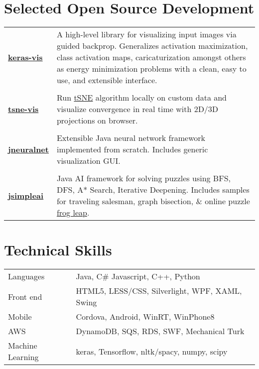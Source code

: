 \documentclass[a4paper,11pt]{article}
\begin{document}
\section{Selected Open Source Development}
\begin{longtable}{l|p{12.5cm}}
\textbf{\href{https://github.com/raghakot/keras-vis}{keras-vis}}
& \footnotesize{ \begin{minipage}[t]{12.5cm} A high-level library for visualizing input images via guided backprop. Generalizes activation maximization, class activation maps, caricaturization amongst others as energy minimization problems with a clean, easy to use, and extensible interface.
 \end{minipage}}
 \\
 \multicolumn{2}{c}{}
 \\
\textbf{\href{https://github.com/raghakot/tsne-visualization}{tsne-vis}}
& \footnotesize{ \begin{minipage}[t]{12.5cm} Run \href{https://lvdmaaten.github.io/tsne/}{tSNE} algorithm locally on custom data and visualize convergence in real time with 2D/3D projections on browser.
 \end{minipage}} 
 \\
 \multicolumn{2}{c}{}
 \\
\textbf{\href{https://github.com/raghakot/jneuralnet}{jneuralnet}}
& \footnotesize{ \begin{minipage}[t]{12.5cm} Extensible Java neural network framework implemented from scratch. Includes generic visualization GUI.
 \end{minipage}} 
 \\
 \multicolumn{2}{c}{}
 \\
\textbf{\href{https://github.com/raghakot/jsimpleai}{jsimpleai}}
& \footnotesize{ \begin{minipage}[t]{12.5cm} Java AI framework for solving puzzles using BFS, DFS, A* Search, Iterative Deepening. Includes samples for traveling salesman, graph bisection, \& online puzzle \href{http://www.justriddlesandmore.com/frogleap.html}{frog leap}.
 \end{minipage}}\\
\end{longtable}

\section{Technical Skills}
\begin{longtable}{lp{11cm}}
 Languages & Java, C\# Javascript, C++, Python \\
 Front end & HTML5, LESS/CSS, Silverlight, WPF, XAML, Swing \\
 Mobile & Cordova, Android, WinRT, WinPhone8 \\
 AWS & DynamoDB, SQS, RDS, SWF, Mechanical Turk \\
 Machine Learning & keras, Tensorflow, nltk/spacy, numpy, scipy \\
\end{longtable}
\end{document}
